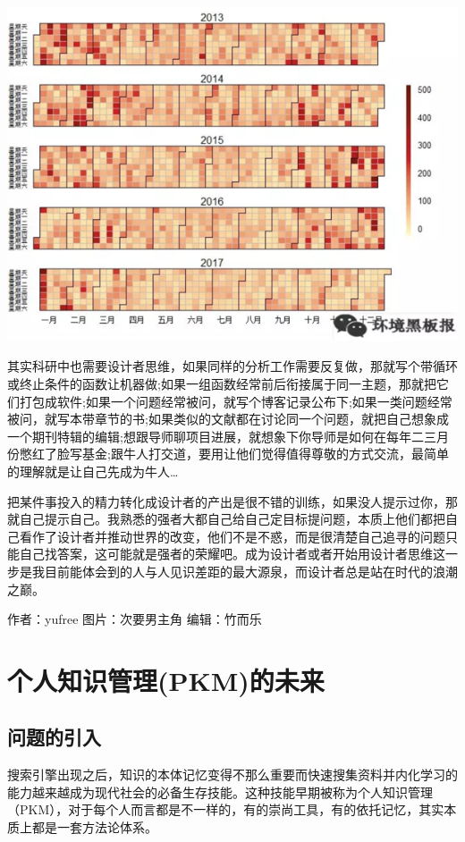 \documentclass[]{book}
\begin{document}
\includegraphics[width=8.33in]{images/sheji5}

其实科研中也需要设计者思维，如果同样的分析工作需要反复做，那就写个带循环或终止条件的函数让机器做;如果一组函数经常前后衔接属于同一主题，那就把它们打包成软件;如果一个问题经常被问，就写个博客记录公布下;如果一类问题经常被问，就写本带章节的书;如果类似的文献都在讨论同一个问题，就把自己想象成一个期刊特辑的编辑;想跟导师聊项目进展，就想象下你导师是如何在每年二三月份憋红了脸写基金;跟牛人打交道，要用让他们觉得值得尊敬的方式交流，最简单的理解就是让自己先成为牛人\ldots{}

把某件事投入的精力转化成设计者的产出是很不错的训练，如果没人提示过你，那就自己提示自己。我熟悉的强者大都自己给自己定目标提问题，本质上他们都把自己看作了设计者并推动世界的改变，他们不是不惑，而是很清楚自己追寻的问题只能自己找答案，这可能就是强者的荣耀吧。成为设计者或者开始用设计者思维这一步是我目前能体会到的人与人见识差距的最大源泉，而设计者总是站在时代的浪潮之巅。

作者：yufree 图片：次要男主角 编辑：竹而乐

\section{个人知识管理(PKM)的未来}\label{pkm}

\subsection{问题的引入}

搜索引擎出现之后，知识的本体记忆变得不那么重要而快速搜集资料并内化学习的能力越来越成为现代社会的必备生存技能。这种技能早期被称为个人知识管理（PKM），对于每个人而言都是不一样的，有的崇尚工具，有的依托记忆，其实本质上都是一套方法论体系。
\end{document}
